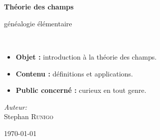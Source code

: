 \begin{titlepage}
%
~\\[1cm]

\begin{center}
\end{center}

\textsc{\Large }\\[0.5cm]

\HRule

\begin{center}
{\huge \bfseries  Théorie des champs\\ }
 
{\Large généalogie élémentaire\\}%
\end{center}

\HRule \\[1.5cm]

\vspace{3cm}
\begin{itemize}[leftmargin=1cm, label=, itemsep=2pt]
\item {\bf Objet :} introduction à la théorie des champs.
\item {\bf Contenu :} définitions et applications.
\item {\bf Public concerné :} curieux en tout genre.
\end{itemize}
\vspace{3cm}


\begin{minipage}{0.4\textwidth}
\begin{flushleft} \large
\end{flushleft}
\end{minipage}
\begin{minipage}{0.4\textwidth}
\begin{flushright} \large
\emph{Auteur:}\\
Stephan \textsc{Runigo}
\end{flushright}
\end{minipage}

\vfill

{\large \today}

\end{titlepage}
